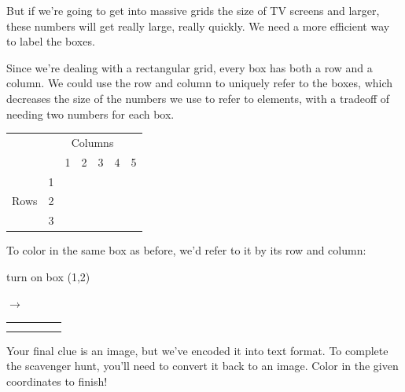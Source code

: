 \documentclass{article}
\begin{document}
But if we're going to get into massive grids the size of TV screens and larger, these numbers will get really large, really quickly. We need a more efficient way to label the boxes.

Since we're dealing with a rectangular grid, every box has both a row and a column. We could use the row and column to uniquely refer to the boxes, which decreases the size of the numbers we use to refer to elements, with a tradeoff of needing two numbers for each box. 

\begin{center}
\begin{tabular}{*{7}{c|}}
\multicolumn{1}{c}{} & \multicolumn{6}{c}{Columns} \\ 
\multicolumn{2}{c}{} & \multicolumn{1}{c}{1} & \multicolumn{1}{c}{2} & \multicolumn{1}{c}{3} & \multicolumn{1}{c}{4} & \multicolumn{1}{c}{5} 
\\ \cline{3-7}
\multirow{3}{*}{Rows} & 1 & & & & & \\ \cline{3-7}
                      & 2 & & & & & \\ \cline{3-7}
                      & 3 & & & & & \\ \cline{3-7}
\end{tabular}
\end{center}


To color in the same box as before, we'd refer to it by its row and column: 

\begin{minipage}[c]{.4\linewidth}
\center
turn on box (1,2) 
\end{minipage}
\begin{minipage}[c]{.2\linewidth} $\rightarrow$ \end{minipage}
\begin{minipage}[c]{.4\linewidth}
\center
\begin{tabular}{*{5}{|c}|}
\hline
 &  & & & \\ \hline
 & & & & \\ \hline
 & & & & \\ \hline
\end{tabular}
\end{minipage}

Your final clue is an image, but we've encoded it into text format. To complete the scavenger hunt, you'll need to convert it back to an image. Color in the given coordinates to finish!

\newpage
\end{document}
